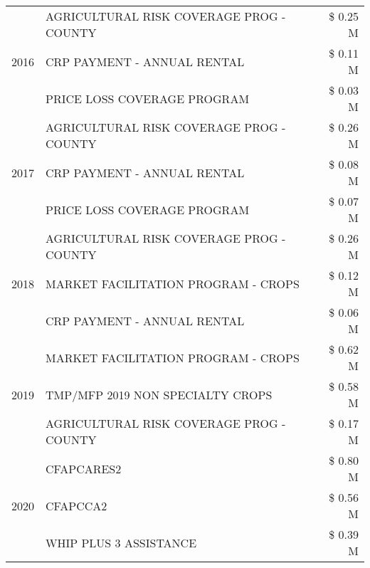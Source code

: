 \begin{tabular}{llr}
\cline{1-3}
\multirow[t]{3}{*}{2016} & AGRICULTURAL RISK COVERAGE PROG - COUNTY & \$ 0.25 M \\
 & CRP PAYMENT - ANNUAL RENTAL & \$ 0.11 M \\
 & PRICE LOSS COVERAGE PROGRAM & \$ 0.03 M \\
\cline{1-3}
\multirow[t]{3}{*}{2017} & AGRICULTURAL RISK COVERAGE PROG - COUNTY & \$ 0.26 M \\
 & CRP PAYMENT - ANNUAL RENTAL & \$ 0.08 M \\
 & PRICE LOSS COVERAGE PROGRAM & \$ 0.07 M \\
\cline{1-3}
\multirow[t]{3}{*}{2018} & AGRICULTURAL RISK COVERAGE PROG - COUNTY & \$ 0.26 M \\
 & MARKET FACILITATION PROGRAM - CROPS & \$ 0.12 M \\
 & CRP PAYMENT - ANNUAL RENTAL & \$ 0.06 M \\
\cline{1-3}
\multirow[t]{3}{*}{2019} & MARKET FACILITATION PROGRAM - CROPS & \$ 0.62 M \\
 & TMP/MFP 2019 NON SPECIALTY CROPS & \$ 0.58 M \\
 & AGRICULTURAL RISK COVERAGE PROG - COUNTY & \$ 0.17 M \\
\cline{1-3}
\multirow[t]{3}{*}{2020} & CFAPCARES2 & \$ 0.80 M \\
 & CFAPCCA2 & \$ 0.56 M \\
 & WHIP PLUS 3 ASSISTANCE & \$ 0.39 M \\
\cline{1-3}
\bottomrule
\end{tabular}
